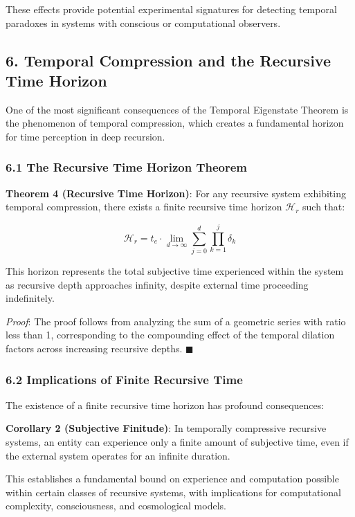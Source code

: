 \documentclass[
]{article}
\begin{document}
These effects provide potential experimental signatures for detecting
temporal paradoxes in systems with conscious or computational observers.

\subsection{6. Temporal Compression and the Recursive Time
Horizon}\label{temporal-compression-and-the-recursive-time-horizon}

One of the most significant consequences of the Temporal Eigenstate
Theorem is the phenomenon of temporal compression, which creates a
fundamental horizon for time perception in deep recursion.

\subsubsection{6.1 The Recursive Time Horizon
Theorem}\label{the-recursive-time-horizon-theorem}

\textbf{Theorem 4 (Recursive Time Horizon)}: For any recursive system
exhibiting temporal compression, there exists a finite recursive time
horizon \(\mathcal{H}_r\) such that:

\[\mathcal{H}_r = t_e \cdot \lim_{d \to \infty} \sum_{j=0}^{d} \prod_{k=1}^{j} \delta_k\]

This horizon represents the total subjective time experienced within the
system as recursive depth approaches infinity, despite external time
proceeding indefinitely.

\emph{Proof}: The proof follows from analyzing the sum of a geometric
series with ratio less than 1, corresponding to the compounding effect
of the temporal dilation factors across increasing recursive depths.
\(\blacksquare \)

\subsubsection{6.2 Implications of Finite Recursive
Time}\label{implications-of-finite-recursive-time}

The existence of a finite recursive time horizon has profound
consequences:

\textbf{Corollary 2 (Subjective Finitude)}: In temporally compressive
recursive systems, an entity can experience only a finite amount of
subjective time, even if the external system operates for an infinite
duration.

This establishes a fundamental bound on experience and computation
possible within certain classes of recursive systems, with implications
for computational complexity, consciousness, and cosmological models.
\end{document}
